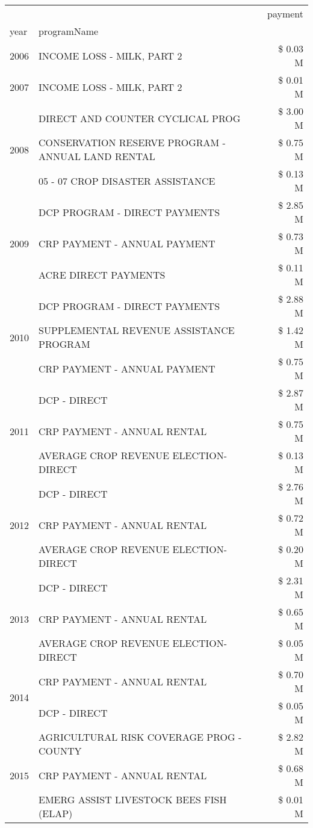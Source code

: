 \begin{tabular}{llr}
\toprule
 &  & payment \\
year & programName &  \\
\midrule
2006 & INCOME LOSS - MILK, PART 2 & \$ 0.03 M \\
\cline{1-3}
2007 & INCOME LOSS - MILK, PART 2 & \$ 0.01 M \\
\cline{1-3}
\multirow[t]{3}{*}{2008} & DIRECT AND COUNTER CYCLICAL PROG & \$ 3.00 M \\
 & CONSERVATION RESERVE PROGRAM - ANNUAL LAND RENTAL & \$ 0.75 M \\
 & 05 - 07 CROP DISASTER ASSISTANCE & \$ 0.13 M \\
\cline{1-3}
\multirow[t]{3}{*}{2009} & DCP PROGRAM - DIRECT PAYMENTS & \$ 2.85 M \\
 & CRP PAYMENT - ANNUAL PAYMENT & \$ 0.73 M \\
 & ACRE DIRECT PAYMENTS & \$ 0.11 M \\
\cline{1-3}
\multirow[t]{3}{*}{2010} & DCP PROGRAM - DIRECT PAYMENTS & \$ 2.88 M \\
 & SUPPLEMENTAL REVENUE ASSISTANCE PROGRAM & \$ 1.42 M \\
 & CRP PAYMENT - ANNUAL PAYMENT & \$ 0.75 M \\
\cline{1-3}
\multirow[t]{3}{*}{2011} & DCP - DIRECT & \$ 2.87 M \\
 & CRP PAYMENT - ANNUAL RENTAL & \$ 0.75 M \\
 & AVERAGE CROP REVENUE ELECTION-DIRECT & \$ 0.13 M \\
\cline{1-3}
\multirow[t]{3}{*}{2012} & DCP - DIRECT & \$ 2.76 M \\
 & CRP PAYMENT - ANNUAL RENTAL & \$ 0.72 M \\
 & AVERAGE CROP REVENUE ELECTION-DIRECT & \$ 0.20 M \\
\cline{1-3}
\multirow[t]{3}{*}{2013} & DCP - DIRECT & \$ 2.31 M \\
 & CRP PAYMENT - ANNUAL RENTAL & \$ 0.65 M \\
 & AVERAGE CROP REVENUE ELECTION-DIRECT & \$ 0.05 M \\
\cline{1-3}
\multirow[t]{2}{*}{2014} & CRP PAYMENT - ANNUAL RENTAL & \$ 0.70 M \\
 & DCP - DIRECT & \$ 0.05 M \\
\cline{1-3}
\multirow[t]{3}{*}{2015} & AGRICULTURAL RISK COVERAGE PROG - COUNTY & \$ 2.82 M \\
 & CRP PAYMENT - ANNUAL RENTAL & \$ 0.68 M \\
 & EMERG ASSIST LIVESTOCK BEES FISH (ELAP) & \$ 0.01 M \\

\end{tabular}
